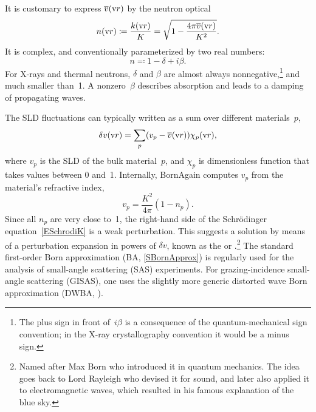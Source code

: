 It is customary to express $\overline{v}(\text{v}{r})$ by the neutron optical 
\begin{equation}\label{EnkK}
  n(\text{v}{r})\coloneqq\frac{k(\text{v}{r})}{K} = \sqrt{1-\frac{4\pi\overline{v}(\text{v}{r})}{K^2}}.
\end{equation}
%
%
%
It is complex, and conventionally parameterized by two real numbers:
\begin{equation}\label{Endb1}
  n \eqqcolon  1-\delta +i\beta.
\end{equation}
%
%
For X-rays and thermal neutrons,
$\delta$ and $\beta$ are almost always nonnegative,\footnote
{The plus sign in front of~$i\beta$ is a consequence of
the quantum-mechanical sign convention;
in the X-ray crystallography convention it would be a minus sign.
%
}
and much smaller than~1.
A nonzero~$\beta$ describes absorption and leads to a damping of propagating waves.
%
%

The SLD fluctuations can typically written as a sum over different materials~$p$,
\begin{equation}
  \delta v(\text{v}{r}) = \sum_p (v_p-\overline{v}(\text{v}{r})) \chi_p(\text{v}{r}),
\end{equation}
where $v_p$ is the SLD of the bulk material~$p$,
and $\chi_p$ is dimensionless function that takes values between 0 and~1.
Internally, BornAgain computes $v_p$ from the material's refractive index,
\begin{equation}
  v_p = \frac{K^2}{4\pi}(1-n_p).
\end{equation}
Since all $n_p$ are very close to~1,
the right-hand side of the Schrödinger equation~\cref{ESchrodiK}
is a weak perturbation.
This suggests a solution
by means of a perturbation expansion in powers of $\delta v$,
%
known as the  or .\footnote{
Named after Max Born
who introduced it in quantum mechanics.
The idea goes back to Lord Rayleigh
who devised it for sound,
and later also applied it to electromagnetic waves,
which resulted in his famous explanation of the blue sky.}
The standard first-order Born approximation (BA, \cref{SBornApprox})
is regularly used  for the analysis of small-angle scattering (SAS) experiments.
%
%
%
For grazing-incidence small-angle scattering (GISAS),
one uses the slightly more generic distorted wave Born approximation (DWBA, ).
%

